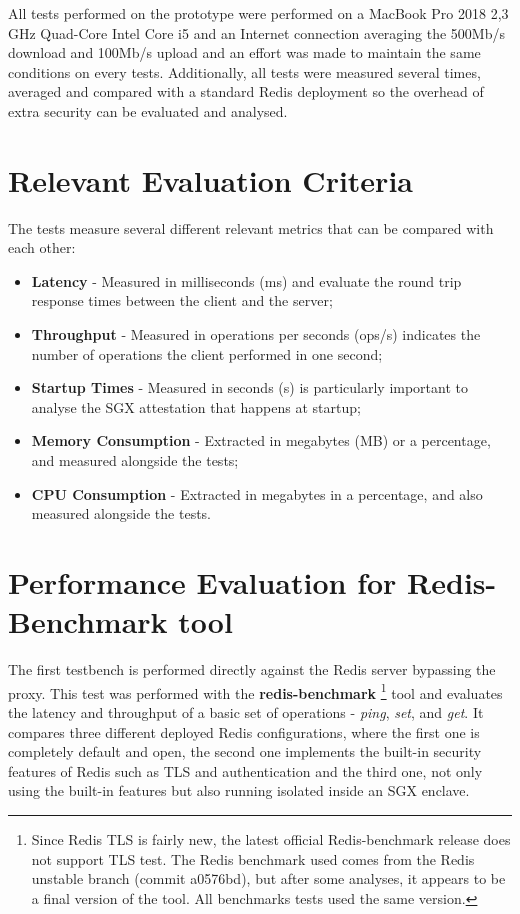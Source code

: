 All tests performed on the prototype were performed on a MacBook Pro 2018 2,3 GHz Quad-Core Intel Core i5 and an Internet connection averaging the 500Mb/s download and 100Mb/s upload and an effort was made to maintain the same conditions on every tests. Additionally, all tests were measured several times, averaged and compared with a standard Redis deployment so the overhead of extra security can be evaluated and analysed. 

\section{Relevant Evaluation Criteria}
\label{sec:revelant_evaluation_criteria}

The tests measure several different relevant metrics that can be compared with each other: 

\begin{itemize}
  \item \textbf{Latency} - Measured in milliseconds (ms) and evaluate the round trip response times between the client and the server;
  \item \textbf{Throughput} - Measured in operations per seconds (ops/s) indicates the number of operations the client performed in one second;
  \item \textbf{Startup Times} - Measured in seconds (s) is particularly important to analyse the \gls{SGX} attestation that happens at startup;
  \item \textbf{Memory Consumption} - Extracted in megabytes (MB) or a percentage, and measured alongside the tests;
  \item \textbf{\gls{CPU} Consumption} - Extracted in megabytes in a percentage, and also measured alongside the tests.
\end{itemize}

\section{Performance Evaluation for Redis-Benchmark tool}
\label{sec:performance_evaluation_redis_benchmark_tool}

The first testbench is performed directly against the Redis server bypassing the proxy. This test was performed with the \textbf{redis-benchmark} \footnote{Since Redis TLS is fairly new, the latest official Redis-benchmark release does not support TLS test. The Redis benchmark used comes from the Redis unstable branch (commit a0576bd), but after some analyses, it appears to be a final version of the tool. All benchmarks tests used the same version.} tool and evaluates the latency and throughput of a basic set of operations - \textit{ping}, \textit{set}, and \textit{get}. It compares three different deployed Redis configurations, where the first one is completely default and open, the second one implements the built-in security features of Redis such as \gls{TLS} and authentication and the third one, not only using the built-in features but also running isolated inside an \gls{SGX} enclave.

